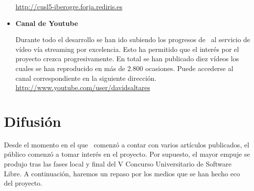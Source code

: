 \begin{itemize}
    \url{http://cusl5-iberogre.forja.rediris.es}\\
    
    \item \textbf{Canal de Youtube}
    
    Durante todo el desarrollo se han ido subiendo los progresos de \juego\
    al servicio de vídeo vía streaming por excelencia. Esto ha permitido
    que el interés por el proyecto crezca progresivamente. En total se han
    publicado diez vídeos los cuales se han reproducido en más de 2.800 ocasiones.
    Puede accederse al canal correspondiente en la siguiente dirección.\\
    
    \url{http://www.youtube.com/user/davidsaltares}\\
    
\end{itemize}


\section*{Difusión}

Desde el momento en el que \wiki\ comenzó a contar con varios artículos
publicados, el público comenzó a tomar interés en el proyecto. Por supuesto,
el mayor empuje se produjo tras las fases local y final del V Concurso
Universitario de Software Libre. A continuación, haremos un repaso por los
medios que se han hecho eco del proyecto.\\

